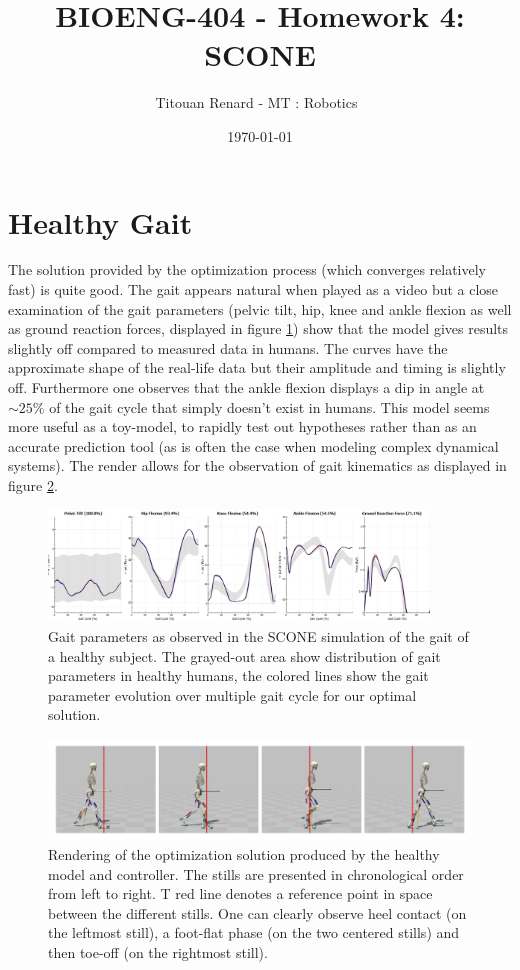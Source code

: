 \documentclass[11pt]{article}
\title{BIOENG-404 - Homework 4: SCONE}
\author{
    Titouan Renard
    - MT : Robotics 
}
\date{\today}
\begin{document}
\maketitle

\section{Healthy Gait}

The solution provided by the optimization process (which converges relatively fast) is quite good. The gait appears natural when played as a video but a close examination of the gait parameters (pelvic tilt, hip, knee and ankle flexion as well as ground reaction forces, displayed in figure \ref{healthy_gait}) show that the model gives results slightly off compared to measured data in humans. The curves have the approximate shape of the real-life data but their amplitude and timing is slightly off. Furthermore one observes that the ankle flexion displays a dip in angle at $\sim 25\%$ of the gait cycle that simply doesn't exist in humans. This model seems more useful as a toy-model, to rapidly test out hypotheses rather than as an accurate prediction tool (as is often the case when modeling complex dynamical systems). The render allows for the observation of gait kinematics as displayed in figure \ref{healthy_render}.

\begin{figure}[h!]
    \centering
    \includegraphics[width=0.9\textwidth]{screens/healthy_gait.png}
    \caption{Gait parameters as observed in the SCONE simulation of the gait of a healthy subject. The grayed-out area show distribution of gait parameters in healthy humans, the colored lines show the gait parameter evolution over multiple gait cycle for our optimal solution.}
    \label{healthy_gait}
\end{figure}

\begin{figure}[h!]
    \centering
    \includegraphics[width=\textwidth]{screens/healthy_render.jpg}
    \caption{Rendering of the optimization solution produced by the healthy model and controller. The stills are presented in chronological order from left to right. T red line denotes a reference point in space between the different stills. One can clearly observe heel contact (on the leftmost still), a foot-flat phase (on the two centered stills) and then toe-off (on the rightmost still).}
    \label{healthy_render}
\end{figure}
\end{document}
